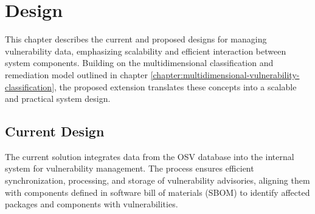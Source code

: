 \chapter{Design}
\label{chapter:design}

This chapter describes the current and proposed designs for managing vulnerability data, emphasizing scalability and efficient interaction between system components. Building on the multidimensional classification and remediation model outlined in chapter \ref{chapter:multidimensional-vulnerability-classification}, the proposed extension translates these concepts into a scalable and practical system design.

\section{Current Design}
\label{sec:current-design}

The current solution integrates data from the \ac{OSV} database into the internal system for vulnerability management. The process ensures efficient synchronization, processing, and storage of vulnerability advisories, aligning them with components defined in software bill of materials (\ac{SBOM}) to identify affected packages and components with vulnerabilities.

